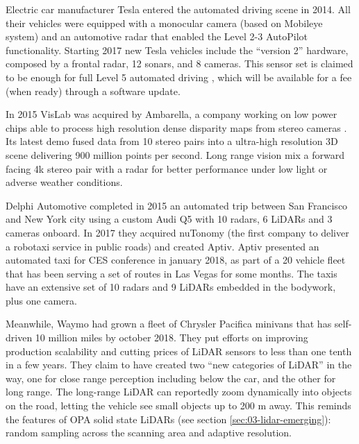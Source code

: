 Electric car manufacturer Tesla entered the automated driving scene in 2014.
All their vehicles were equipped with a monocular camera (based on 
Mobileye system) and an automotive radar that enabled the Level 2-3 AutoPilot
functionality. 
Starting 2017 new Tesla vehicles include the ``version 2'' hardware, 
composed by a frontal radar, 12 sonars, and 8 cameras.
This sensor set is claimed to be enough for full Level 5 automated driving
\cite{Hawkins2017}, which will be available for a fee (when ready) through a
software update.

In 2015 VisLab was acquired by Ambarella, a company working on low power chips
able to process high resolution dense disparity maps from stereo cameras
\cite{Ambarella2018}. 
Its latest demo \cite{AUVSI2018} fused data from 10 stereo pairs into a
ultra-high resolution 3D scene delivering 900 million points per second.
Long range vision mix a forward facing 4k stereo pair with a radar for better
performance under low light or adverse weather conditions. 

Delphi Automotive completed in 2015 an automated trip between San Francisco and
New York city using a custom Audi Q5 with 10 radars, 6 LiDARs and 3 cameras 
onboard. In 2017 they acquired nuTonomy (the first company to deliver a 
robotaxi service in public roads) and created Aptiv. 
Aptiv presented an automated taxi for CES conference in january 2018, as part
of a 20 vehicle fleet that has been serving a set of routes in Las Vegas for
some months. The taxis have an extensive set of 10 radars and 9 LiDARs embedded 
in the bodywork, plus one camera.

Meanwhile, Waymo had grown a fleet of Chrysler Pacifica minivans that has
self-driven 10 million miles by october 2018. They put efforts on improving
production scalability and cutting prices of LiDAR sensors to less
than one tenth in a few years. 
They claim to have created two ``new categories of LiDAR'' \cite{Waymoteam2017} 
in the way, one for close range perception including below the car, and the
other for long range. The long-range LiDAR can reportedly zoom dynamically into 
objects on the road, letting the vehicle see small objects up to 200 m away. 
This reminds the features of OPA solid state LiDARs (see section
\ref{sec:03-lidar-emerging}): random sampling across the 
scanning area and adaptive resolution.

